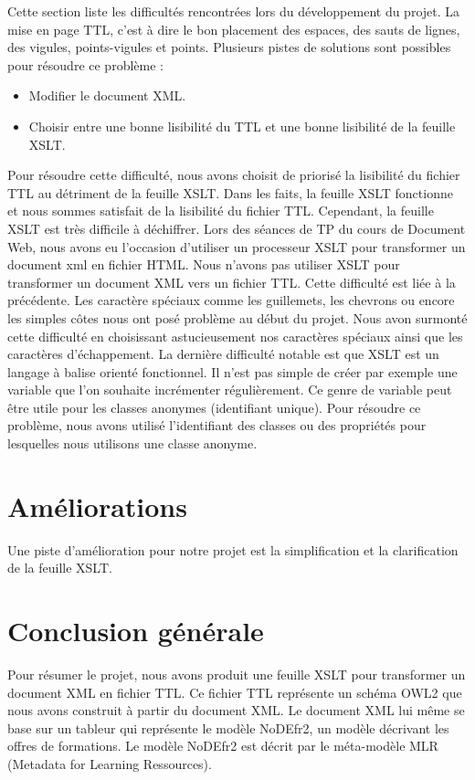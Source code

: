 \documentclass[11pt]{report}
\begin{document}
Cette section liste les difficultés rencontrées lors du développement du projet.
\hfill \break
\hfill \break
La mise en page TTL, c'est à dire le bon placement des espaces, des sauts de lignes, des vigules, points-vigules et points. Plusieurs pistes de solutions sont possibles pour résoudre ce problème :
\begin{itemize}
\item Modifier le document XML.
\item Choisir entre une bonne lisibilité du TTL et une bonne lisibilité de la feuille XSLT.
\end{itemize}
Pour résoudre cette difficulté, nous avons choisit de priorisé la lisibilité du fichier TTL au détriment de la feuille XSLT. Dans les faits, la feuille XSLT fonctionne et nous sommes satisfait de la lisibilité du fichier TTL. Cependant, la feuille XSLT est très difficile à déchiffrer.
\hfill \break
\hfill \break
Lors des séances de TP du cours de Document Web, nous avons eu l'occasion d'utiliser un processeur XSLT pour transformer un document xml en fichier HTML. Nous n'avons pas utiliser XSLT pour transformer un document XML vers un fichier TTL. Cette difficulté est liée à la précédente.
\hfill \break
\hfill \break
Les caractère spéciaux comme les guillemets, les chevrons ou encore les simples côtes nous ont posé problème au début du projet. Nous avon surmonté cette difficulté en choisissant astucieusement nos caractères spéciaux ainsi que les caractères d'échappement.
\hfill \break
\hfill \break
La dernière difficulté notable est que XSLT est un langage à balise orienté fonctionnel. Il n'est pas simple de créer par exemple une variable que l'on souhaite incrémenter régulièrement. Ce genre de variable peut être utile pour les classes anonymes (identifiant unique). Pour résoudre ce problème, nous avons utilisé l'identifiant des classes ou des propriétés pour lesquelles nous utilisons une classe anonyme.

\section{Améliorations}
Une piste d'amélioration pour notre projet est la simplification et la clarification de la feuille XSLT.

\section{Conclusion générale}
Pour résumer le projet, nous avons produit une feuille XSLT pour transformer un document XML en fichier TTL. Ce fichier TTL représente un schéma OWL2 que nous avons construit à partir du document XML. Le document XML lui même se base sur un tableur qui représente le modèle NoDEfr2, un modèle décrivant les offres de formations. Le modèle NoDEfr2 est décrit par le méta-modèle MLR (Metadata for Learning Ressources).
\end{document}
